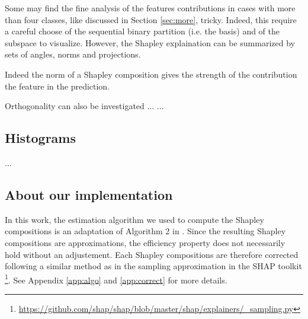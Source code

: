 \documentclass{article}
\theoremstyle{plain}
\theoremstyle{definition}
\theoremstyle{remark}
\begin{document}
Some may find the fine analysis of the features contributions in cases with more than four classes, like discussed in Section \ref{sec:more}, tricky. Indeed, this require a careful choose of the sequential binary partition (i.e. the basis) and of the subspace to visualize. However, the Shapley explaination can be summarized by sets of angles, norms and projections.

Indeed the norm of a Shapley composition gives the strength of the contribution the feature in the prediction.

Orthogonality can also be investigated ...
...

\subsection{Histograms}

...
\subsection{About our implementation}

In this work, the estimation algorithm we used to compute the Shapley compositions is an adaptation of Algorithm 2 in \cite{vstrumbelj2014explaining}. Since the resulting Shapley compositions are approximations, the efficiency property does not necessarily hold without an adjustement. Each Shapley compositions are therefore corrected following a similar method as in the sampling approximation in the SHAP toolkit \cite{NIPS2017_7062}\footnote{\url{https://github.com/shap/shap/blob/master/shap/explainers/_sampling.py}}. See Appendix \ref{app:algo} and \ref{app:correct} for more details.


\end{document}
